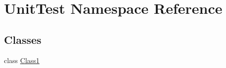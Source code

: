 \hypertarget{namespace_unit_test}{}\section{Unit\+Test Namespace Reference}
\label{namespace_unit_test}
\subsection*{Classes}
\begin{DoxyCompactItemize}
\item 
class \mbox{\hyperlink{class_unit_test_1_1_class1}{Class1}}
\end{DoxyCompactItemize}
